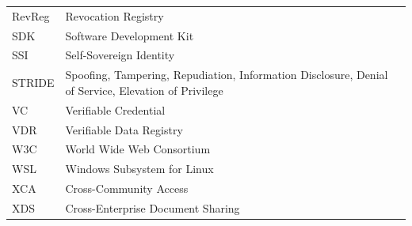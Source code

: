 \begin{center}
\begin{tabular}{@{}p{}p{}@{}}
    RevReg & Revocation Registry \\
    SDK & Software Development Kit \\
    SSI & Self-Sovereign Identity \\
    STRIDE & Spoofing, Tampering, Repudiation, Information Disclosure, Denial of Service, Elevation of Privilege \\
    VC & Verifiable Credential \\
    VDR & Verifiable Data Registry \\
    W3C & World Wide Web Consortium \\
    WSL & Windows Subsystem for Linux \\
    XCA & Cross-Community Access \\
    XDS & Cross-Enterprise Document Sharing \\
\end{tabular}
\end{center}